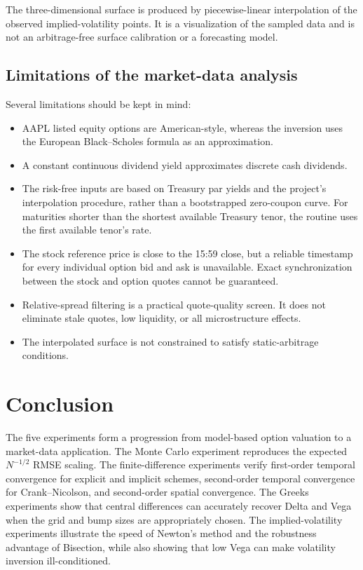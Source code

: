 \documentclass[11pt,a4paper]{article}
\begin{document}
The three-dimensional surface is produced by piecewise-linear interpolation of the observed implied-volatility points. It is a visualization of the sampled data and is not an arbitrage-free surface calibration or a forecasting model.

\subsection{Limitations of the market-data analysis}

Several limitations should be kept in mind:
\begin{itemize}
  \item AAPL listed equity options are American-style, whereas the inversion uses the European Black--Scholes formula as an approximation.
  \item A constant continuous dividend yield approximates discrete cash dividends.
  \item The risk-free inputs are based on Treasury par yields and the project's interpolation procedure, rather than a bootstrapped zero-coupon curve. For maturities shorter than the shortest available Treasury tenor, the routine uses the first available tenor's rate.
  \item The stock reference price is close to the 15:59 close, but a reliable timestamp for every individual option bid and ask is unavailable. Exact synchronization between the stock and option quotes cannot be guaranteed.
  \item Relative-spread filtering is a practical quote-quality screen. It does not eliminate stale quotes, low liquidity, or all microstructure effects.
  \item The interpolated surface is not constrained to satisfy static-arbitrage conditions.
\end{itemize}

\section{Conclusion}

The five experiments form a progression from model-based option valuation to a market-data application. The Monte Carlo experiment reproduces the expected $N^{-1/2}$ RMSE scaling. The finite-difference experiments verify first-order temporal convergence for explicit and implicit schemes, second-order temporal convergence for Crank--Nicolson, and second-order spatial convergence. The Greeks experiments show that central differences can accurately recover Delta and Vega when the grid and bump sizes are appropriately chosen. The implied-volatility experiments illustrate the speed of Newton's method and the robustness advantage of Bisection, while also showing that low Vega can make volatility inversion ill-conditioned.
\end{document}
